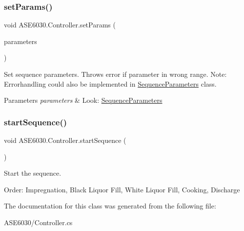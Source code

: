 \subsubsection{\texorpdfstring{set\+Params()}{setParams()}}
{\footnotesize\ttfamily void A\+S\+E6030.\+Controller.\+set\+Params (\begin{DoxyParamCaption}\item[{\hyperlink{class_a_s_e6030_1_1_sequence_parameters}{Sequence\+Parameters}}]{parameters }\end{DoxyParamCaption})\hspace{0.3cm}{\ttfamily [inline]}}

Set sequence parameters. Throws error if parameter in wrong range. Note\+: Errorhandling could also be implemented in \hyperlink{class_a_s_e6030_1_1_sequence_parameters}{Sequence\+Parameters} class. 
\begin{DoxyParams}{Parameters}
{\em parameters} & Look\+: \hyperlink{class_a_s_e6030_1_1_sequence_parameters}{Sequence\+Parameters} \\
\hline
\end{DoxyParams}
\mbox{\label{class_a_s_e6030_1_1_controller_afca76c3628ed37f21c1aac044a5e0441}} 
\subsubsection{\texorpdfstring{start\+Sequence()}{startSequence()}}
{\footnotesize\ttfamily void A\+S\+E6030.\+Controller.\+start\+Sequence (\begin{DoxyParamCaption}{ }\end{DoxyParamCaption})\hspace{0.3cm}{\ttfamily [inline]}}



Start the sequence. 

Order\+: Impregnation, Black Liquor Fill, White Liquor Fill, Cooking, Discharge 

The documentation for this class was generated from the following file\+:\begin{DoxyCompactItemize}
\item 
A\+S\+E6030/Controller.\+cs\end{DoxyCompactItemize}
